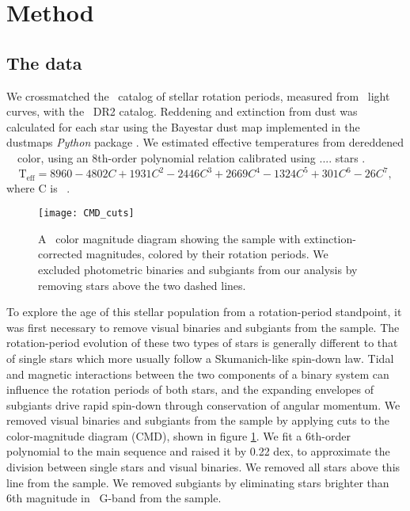 \section{Method}

\subsection{The data}

We crossmatched the \mct\ catalog of stellar rotation periods, measured from
\kepler\ light curves, with the \gaia\ DR2 catalog.
Reddening and extinction from dust was calculated for each star using the
Bayestar dust map implemented in the dustmaps {\it Python} package
\citep{green2018}.
We estimated effective temperatures from dereddened \Gaia\ \gcolor\ color,
using an 8th-order polynomial relation calibrated using .... stars
.
\begin{equation}
    \mathrm{T_{eff}} = 8960 -4802C + 1931C^2 -2446C^3 + 2669C^4 - 1324C^5 +
    301C^6 - 26C^7,
\end{equation}
where C is \gaia\ \gcolor.

\begin{figure}
  \caption{
A \gaia\ color magnitude diagram showing the \citet{mcquillan2014} sample with
    extinction-corrected magnitudes, colored by their rotation periods.
We excluded photometric binaries and subgiants from our analysis by removing
stars above the two dashed lines.
}
  \centering
    \texttt{[image: CMD\_cuts]}
\label{fig:CMD_cuts}
\end{figure}
To explore the age of this stellar population from a rotation-period
standpoint, it was first necessary to remove visual binaries and subgiants
from the sample.
The rotation-period evolution of these two types of stars is generally
different to that of single stars which more usually follow a Skumanich-like
spin-down law.
Tidal and magnetic interactions between the two components of a binary system
can influence the rotation periods of both stars, and the expanding envelopes
of subgiants drive rapid spin-down through conservation of angular momentum.
We removed visual binaries and subgiants from the sample by applying cuts to
the color-magnitude diagram (CMD), shown in figure \ref{fig:CMD_cuts}.
We fit a 6th-order polynomial to the main sequence and raised it by 0.22 dex,
to approximate the division between single stars and visual binaries.
We removed all stars above this line from the sample.
We removed subgiants by eliminating stars brighter than 6th magnitude in
\gaia\ G-band from the sample.

